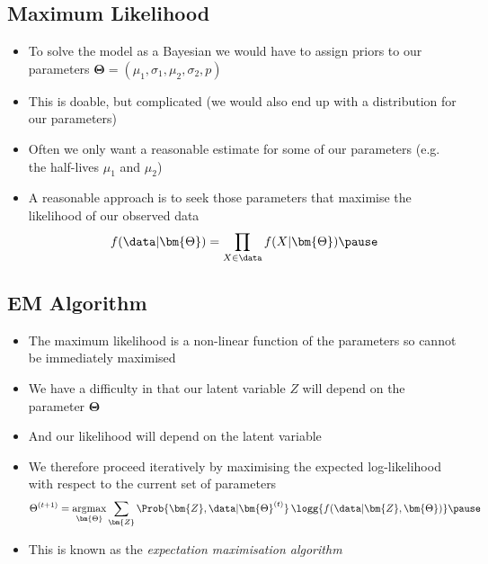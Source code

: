\begin{slide}
\section[-1]{Maximum Likelihood}

\begin{PauseHighLight}
  \begin{itemize}
  \item To solve the model as a Bayesian we would have to assign priors
    to our parameters $\bm{\Theta} = (\mu_1, \sigma_1, \mu_2,
    \sigma_2, p)$\pause
  \item This is doable, but complicated (we would also end up with a
    distribution for our parameters)\pause
  \item Often we only want a reasonable estimate for some of our
    parameters (e.g. the half-lives $\mu_1$ and $\mu_2$)\pause
  \item A reasonable approach is to seek those parameters that maximise the
    likelihood of our observed data
    \begin{align*}
      f(\data|\bm{\Theta}) = \prod_{X\in\data} f(X|\bm{\Theta})\pause
    \end{align*}
  \end{itemize}
\end{PauseHighLight}

\end{slide}


\begin{slide}
\section[-1]{EM Algorithm}

\begin{PauseHighLight}
  \begin{itemize}
  \item The maximum likelihood is a non-linear function of the
    parameters so cannot be immediately maximised\pause
  \item We have a difficulty in that our latent variable $Z$ will depend
    on the parameter $\bm{\Theta}$\pause
  \item And our likelihood will depend on the latent variable\pause
  \item We therefore proceed iteratively by maximising the expected
    log-likelihood with respect to the current set of parameters
    \begin{align*}
      \Theta^{(t+1)} = \mathop{\mathrm{argmax}}_{\bm{\Theta}}
      \sum_{\bm{Z}} \Prob{\bm{Z},\data|\bm{\Theta}^{(t)}}\,
      \logg{f(\data|\bm{Z}, \bm{\Theta})}\pause
    \end{align*}
  \item This is known as the \emph{expectation maximisation algorithm}\pause
  \end{itemize}
\end{PauseHighLight}

\end{slide}

